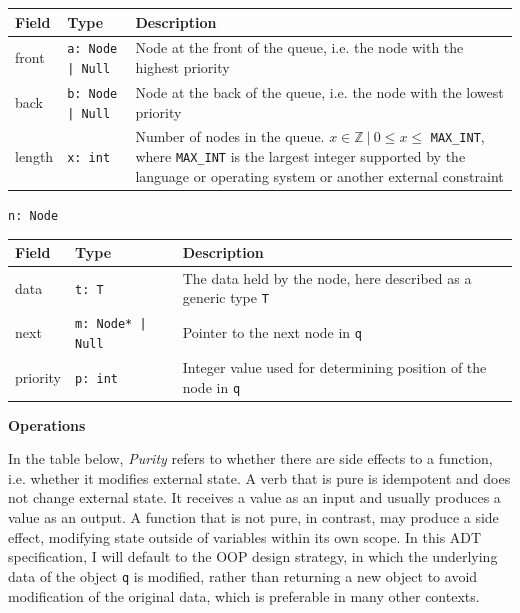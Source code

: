 \documentclass[10pt,letterpaper,final]{report}
\begin{document}
\begin{center}
  \begin{tabularx}{\textwidth}{|l|l|X|}
    \hline
    Field  & Type                  & Description                                                                                                                                                                                                   \\ \hline
    front  & \verb+a: Node | Null+ & Node at the front of the queue, i.e. the node with the highest priority                                                                                                                                       \\ \hline
    back   & \verb+b: Node | Null+ & Node at the back of the queue, i.e. the node with the lowest priority                                                                                                                                         \\ \hline
    length & \verb+x: int+         & Number of nodes in the queue. $x \in \mathbb{Z}\ \vert\ 0 \le x \le$ \verb|MAX_INT|, where \verb|MAX_INT| is the largest integer supported by the language or operating system or another external constraint \\ \hline
  \end{tabularx}
\end{center}

\noindent\verb|n: Node|

\begin{center}
  \begin{tabularx}{\textwidth}{|l|l|X|}
    \hline
    Field    & Type                   & Description                                                          \\ \hline
    data     & \verb|t: T|            & The data held by the node, here described as a generic type \verb|T| \\ \hline
    next     & \verb+m: Node* | Null+ & Pointer to the next node in \verb|q|                                 \\ \hline
    priority & \verb|p: int|          & Integer value used for determining position of the node in \verb|q|  \\ \hline
  \end{tabularx}
\end{center}

\noindent\textbf{Operations}

In the table below, \emph{Purity} refers to whether there are side effects to a function, i.e. whether it modifies external state. A verb that is pure is idempotent and does not change external state. It receives a value as an input and usually produces a value as an output. A function that is not pure, in contrast, may produce a side effect, modifying state outside of variables within its own scope. In this ADT specification, I will default to the OOP design strategy, in which the underlying data of the object \verb|q| is modified, rather than returning a new object to avoid modification of the original data, which is preferable in many other contexts.
\end{document}
